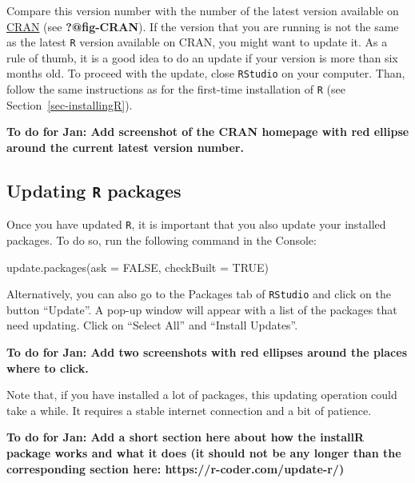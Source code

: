 \documentclass[
  letterpaper,
  DIV=11,
  numbers=noendperiod]{scrreprt}
\newenvironment{Shaded}{\begin{snugshade}}{\end{snugshade}}
\newcommand{\AttributeTok}[1]{\textcolor[rgb]{0.40,0.45,0.13}{#1}}
\newcommand{\ConstantTok}[1]{\textcolor[rgb]{0.56,0.35,0.01}{#1}}
\newcommand{\FunctionTok}[1]{\textcolor[rgb]{0.28,0.35,0.67}{#1}}
\newcommand{\NormalTok}[1]{\textcolor[rgb]{0.00,0.23,0.31}{#1}}
\begin{document}
Compare this version number with the number of the latest version
available on \href{https://cran.r-project.org/}{CRAN} (see
\textbf{?@fig-CRAN}). If the version that you are running is not the
same as the latest \texttt{R} version available on CRAN, you might want
to update it. As a rule of thumb, it is a good idea to do an update if
your version is more than six months old. To proceed with the update,
close \texttt{RStudio} on your computer. Than, follow the same
instructions as for the first-time installation of \texttt{R} (see
Section~\ref{sec-installingR}).

\textbf{To do for Jan: Add screenshot of the CRAN homepage with red
ellipse around the current latest version number.}

\subsection{\texorpdfstring{Updating \texttt{R}
packages}{Updating R packages}}\label{updating-r-packages}

Once you have updated \texttt{R}, it is important that you also update
your installed packages. To do so, run the following command in the
Console:

\begin{Shaded}
\begin{Highlighting}[]
\FunctionTok{update.packages}\NormalTok{(}\AttributeTok{ask =} \ConstantTok{FALSE}\NormalTok{, }\AttributeTok{checkBuilt =} \ConstantTok{TRUE}\NormalTok{)}
\end{Highlighting}
\end{Shaded}

Alternatively, you can also go to the Packages tab of \texttt{RStudio}
and click on the button ``Update''. A pop-up window will appear with a
list of the packages that need updating. Click on ``Select All'' and
``Install Updates''.

\textbf{To do for Jan: Add two screenshots with red ellipses around the
places where to click.}

Note that, if you have installed a lot of packages, this updating
operation could take a while. It requires a stable internet connection
and a bit of patience. 🧘🏾

\begin{tcolorbox}[enhanced jigsaw, opacityback=0, bottomrule=.15mm, left=2mm, coltitle=black, bottomtitle=1mm, opacitybacktitle=0.6, leftrule=.75mm, arc=.35mm, breakable, toptitle=1mm, colframe=quarto-callout-note-color-frame, colback=white, titlerule=0mm, colbacktitle=quarto-callout-note-color!10!white, title=\textcolor{quarto-callout-note-color}{\faInfo}\hspace{0.5em}{Updating \texttt{R} using \{installr\} (for Windows only)}, rightrule=.15mm, toprule=.15mm]

\textbf{To do for Jan: Add a short section here about how the installR
package works and what it does (it should not be any longer than the
corresponding section here: https://r-coder.com/update-r/)}

\end{tcolorbox}
\end{document}
